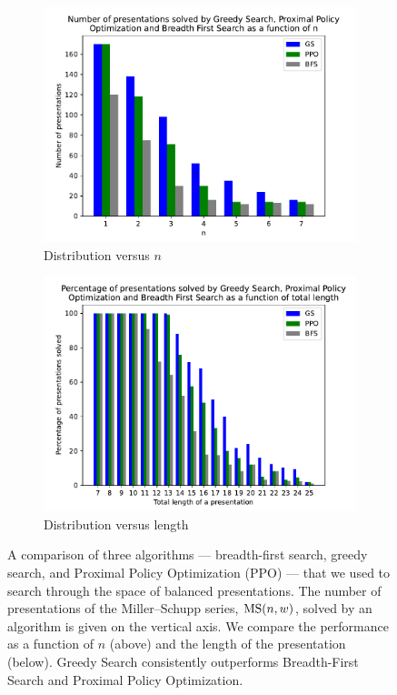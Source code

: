 \begin{figure}
	\centering
	\begin{subfigure}[b]{0.5\textwidth}
		\includegraphics[width=1.1\textwidth]{fig/performance_vs_n.pdf}
		\caption{Distribution versus $n$}
		\label{fig:performance_vs_n}
	\end{subfigure}
	\begin{subfigure}[b]{0.5\textwidth}
		\centering
		\includegraphics[width=1.1\textwidth]{fig/performance_vs_length.pdf}
		\caption{Distribution versus length}
		\label{fig:performance_vs_length}
	\end{subfigure}
	\caption{A comparison of three algorithms --- breadth-first search, greedy search, and Proximal Policy Optimization (PPO) --- that we used to search through the space of balanced presentations. The number of presentations of the Miller--Schupp series, $\text{MS}(n, w)$, solved by an algorithm is given on the vertical axis. We compare the performance as a function of $n$ (above) and the length of the presentation (below). Greedy Search consistently outperforms Breadth-First Search and Proximal Policy Optimization.}
	\label{fig:performance}
\end{figure}


